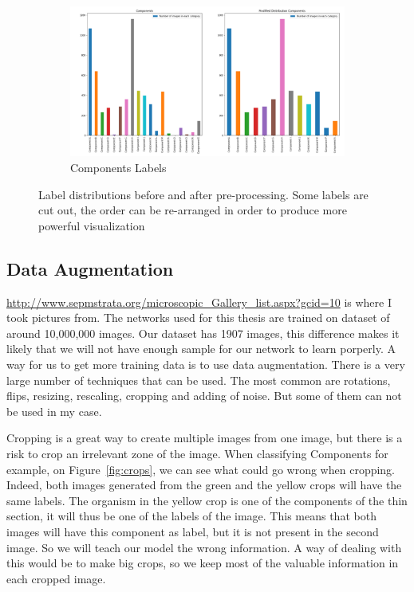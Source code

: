 \begin{figure}
\begin{subfigure}{.5\textwidth}
  \centering
  \includegraphics[width=.8\linewidth]{figures/03-Components.PNG}
  \caption{Components Labels}
  \label{fig:compolab}
\end{subfigure}
\caption{Label distributions before and after pre-processing. Some labels are cut out,  the order can be re-arranged in order to produce more powerful visualization}
\label{fig:labelsdistrib}
\end{figure}

\subsection{Data Augmentation}
\url{http://www.sepmstrata.org/microscopic_Gallery_list.aspx?gcid=10} is where I took pictures from. 
The networks used for this thesis are trained on dataset of around 10,000,000 images. Our dataset has 1907 images, this difference makes it likely that we will not have enough sample for our network to learn porperly. A way for us to get more training data is to use data augmentation.  There is a very large number of techniques that can be used. The most common are rotations, flips, resizing, rescaling, cropping and adding of noise. But some of them can not be used in my case. 

Cropping is a great way to create multiple images from one image, but there is a risk to crop an irrelevant zone of the image. When classifying Components for example, on Figure~\ref{fig:crops}, we can see what could go wrong when cropping. Indeed, both images generated from the green and the yellow crops will have the same labels. The organism in the yellow crop is one of the components of the thin section, it will thus be one of the labels of the image. This means that both images will have this component as label, but it is not present in the second image. So we will teach our model the wrong information. A way of dealing with this would be to make big crops, so we keep most of the valuable information in each cropped image.  

